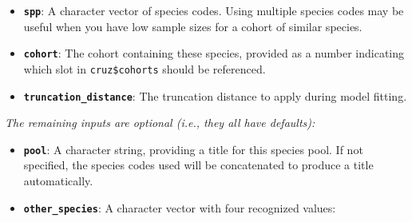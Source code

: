 \documentclass[
]{book}
\begin{document}
\begin{itemize}
\item
  \textbf{\texttt{spp}}: A character vector of species codes. Using multiple species codes may be useful when you have low sample sizes for a cohort of similar species.
\item
  \textbf{\texttt{cohort}}: The cohort containing these species, provided as a number indicating which slot in \texttt{cruz\$cohorts} should be referenced.
\item
  \textbf{\texttt{truncation\_distance}}: The truncation distance to apply during model fitting.
\end{itemize}

\emph{The remaining inputs are optional (i.e., they all have defaults):}

\begin{itemize}
\item
  \textbf{\texttt{pool}}: A character string, providing a title for this species pool. If not specified, the species codes used will be concatenated to produce a title automatically.
\item
  \textbf{\texttt{other\_species}}: A character vector with four recognized values:


\end{itemize}
\end{document}

